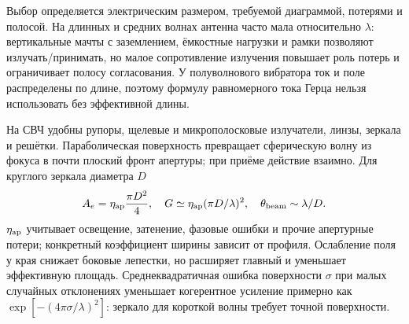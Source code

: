 
Выбор определяется электрическим размером, требуемой диаграммой, потерями и полосой. На длинных и средних волнах антенна часто мала относительно $\lambda$: вертикальные мачты с заземлением, ёмкостные нагрузки и рамки позволяют излучать/принимать, но малое сопротивление излучения повышает роль потерь и ограничивает полосу согласования. У полуволнового вибратора ток и поле распределены по длине, поэтому формулу равномерного тока Герца нельзя использовать без эффективной длины.

На СВЧ удобны рупоры, щелевые и микрополосковые излучатели, линзы, зеркала и решётки. Параболическая поверхность превращает сферическую волну из фокуса в почти плоский фронт апертуры; при приёме действие взаимно. Для круглого зеркала диаметра $D$
\begin{equation}
 A_e=\eta_{\rm ap}\frac{\pi D^2}{4},\quad
 G\simeq\eta_{\rm ap}(\pi D/\lambda)^2,\quad
 \theta_{\rm beam}\sim\lambda/D.
\end{equation}
$\eta_{\rm ap}$ учитывает освещение, затенение, фазовые ошибки и прочие апертурные потери; конкретный коэффициент ширины зависит от профиля. Ослабление поля у края снижает боковые лепестки, но расширяет главный и уменьшает эффективную площадь. Среднеквадратичная ошибка поверхности $\sigma$ при малых случайных отклонениях уменьшает когерентное усиление примерно как $\exp[-(4\pi\sigma/\lambda)^2]$: зеркало для короткой волны требует точной поверхности.
